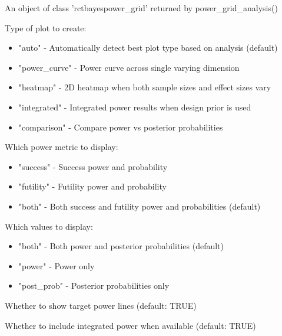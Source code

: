 \documentclass[letterpaper]{book}
\begin{document}
\begin{Arguments}
\begin{ldescription}
\item[\code{x}] An object of class 'rctbayespower\_grid' returned by power\_grid\_analysis()

\item[\code{type}] Type of plot to create:
\begin{itemize}

\item{} "auto" - Automatically detect best plot type based on analysis (default)
\item{} "power\_curve" - Power curve across single varying dimension
\item{} "heatmap" - 2D heatmap when both sample sizes and effect sizes vary
\item{} "integrated" - Integrated power results when design prior is used
\item{} "comparison" - Compare power vs posterior probabilities

\end{itemize}


\item[\code{metric}] Which power metric to display:
\begin{itemize}

\item{} "success" - Success power and probability
\item{} "futility" - Futility power and probability
\item{} "both" - Both success and futility power and probabilities (default)

\end{itemize}


\item[\code{values}] Which values to display:
\begin{itemize}

\item{} "both" - Both power and posterior probabilities (default)
\item{} "power" - Power only
\item{} "post\_prob" - Posterior probabilities only

\end{itemize}


\item[\code{show\_target}] Whether to show target power lines (default: TRUE)

\item[\code{show\_integrated}] Whether to include integrated power when available (default: TRUE)


\end{ldescription}
\end{Arguments}
\end{document}
